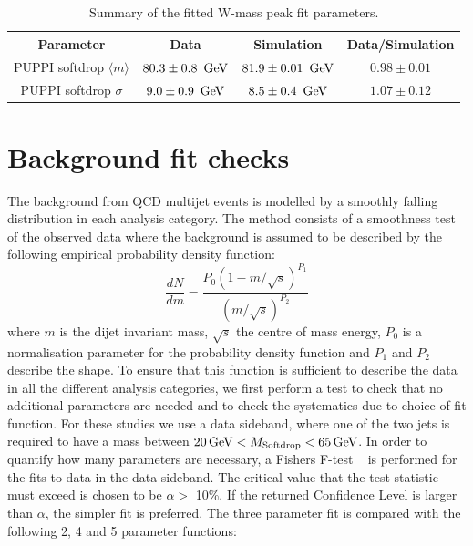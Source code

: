 \begin{table}[!h]
 \begin{center}
 \begin{tabular}{c|c|c|c}
  Parameter & Data & Simulation & Data/Simulation \\
  \hline
  PUPPI softdrop $\langle m \rangle$ & $80.3 \pm 0.8~{\rm \,\text{Ge\hspace{-.08em}V}}$ & $81.9 \pm 0.01~{\rm \,\text{Ge\hspace{-.08em}V}}$ & $0.98 \pm 0.01$ \\%
  PUPPI softdrop $\sigma$            & $ 9.0 \pm 0.9~{\rm \,\text{Ge\hspace{-.08em}V}}$ &  $8.5 \pm 0.4~{\rm \,\text{Ge\hspace{-.08em}V}}$  & $1.07 \pm 0.12$ \\%
  \hline
 \end{tabular}
 \caption{Summary of the fitted W-mass peak fit parameters.}
 \label{tab:app:wtagparams}
 \end{center}
\end{table}

\section{Background fit checks}
\label{app:2016xcheck}

The background from QCD multijet events is modelled by a smoothly falling distribution in each analysis category. The method consists of a smoothness test of the observed data where the background is assumed to be described by the following empirical probability density function:
\begin{equation}
\label{eq:dijet}
\frac{dN}{dm}= \frac{ P_0(1-m/\sqrt{s})^{P_1} } { (m/\sqrt{s})^{P_2} }
\end{equation}
where $m$ is the dijet invariant mass, $\sqrt{s}$ the centre of mass energy, $P_0$ is a normalisation parameter for the probability density function and $P_1$ and $ P_2$ describe the shape. To ensure that this function is sufficient to describe the data in all the different analysis categories, we first perform a test to check that no additional parameters are needed and to check the systematics due to choice of fit function. For these studies we use a data sideband, where one of the two jets is required to have a mass between $20 \,\text{Ge\hspace{-.08em}V} < M_{\rm{Softdrop}} < 65 \,\text{Ge\hspace{-.08em}V}$. In order to quantify how many parameters are necessary, a Fishers F-test ~\cite{RePEc:bla:istatr:v:80:y:2012:i:3:p:491-491} is performed for the fits to data in the data sideband. The critical value that the test statistic must exceed is chosen to be $\alpha > $ 10\%. If the returned Confidence Level is larger than $\alpha$, the simpler fit is preferred.
The three parameter fit is compared with the following 2, 4 and 5 parameter functions:

